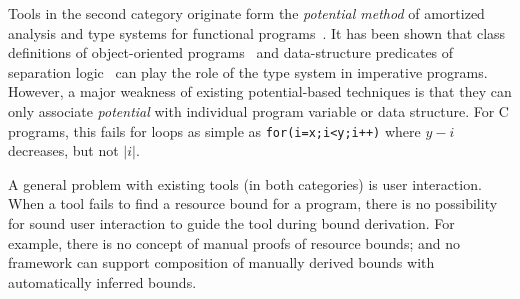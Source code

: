\documentclass[nocopyrightspace,preprint,pldi]{sigplanconf-pldi15}
\begin{document}
Tools in the second category originate form the {\em potential method}
of amortized analysis and type systems for functional
programs~\cite{Jost03,HoffmannAH12}. It has been shown that class
definitions of object-oriented programs~\cite{Jost06} and
data-structure predicates of separation logic~\cite{Atkey10} can play
the role of the type system in imperative programs.
However, a major weakness of existing potential-based techniques
is that they can only associate \emph{potential}
with individual program variable or data structure.
For C programs, this
fails for loops as simple as \lstinline{for(i=x;i<y;i++)} where
$y-i$ decreases, but not $|i|$. %


A general problem with existing tools (in both categories) is user interaction. When a tool
fails to find a resource bound for a program, there is no possibility
for sound user interaction to guide the tool during bound
derivation.
For example, there is no concept of manual proofs of
resource bounds; and no framework can support composition
of manually derived bounds with automatically inferred bounds.

\end{document}
